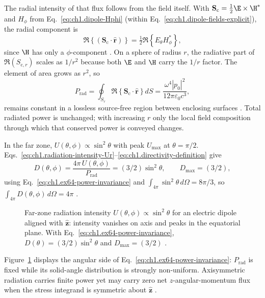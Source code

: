 The radial intensity of that flux follows from the field itself. With
$\mathbf{S}_\mathrm{c}=\tfrac12\E\times\H^*$ and $H_\phi$ from
Eq.~\eqref{eq:ch1.dipole-Hphi} (within Eq.~\eqref{eq:ch1.dipole-fields-explicit}), the radial component is
\begin{equation}
\label{eq:ch1.dipole-sc-radial}
\Re\!\left\{(\mathbf{S}_\mathrm{c}\cdot\hat{\mathbf{r}})\right\}
=\tfrac12\Re\!\left\{E_\theta H_\phi^*\right\},
\end{equation}
since $\H$ has only a $\phi$-component \cite{stratton1941}.
On a sphere of radius $r$, the radiative part of $\Re(S_{\mathrm{c},r})$ scales as $1/r^2$ because both $\E$ and $\H$ carry the $1/r$ factor. The element of area grows as $r^2$, so
\begin{equation}
\label{eq:ch1.ex64-power-invariance}
P_{\mathrm{rad}}=\oint_{S_r}\Re\!\left\{\mathbf{S}_\mathrm{c}\cdot\hat{\mathbf{r}}\right\}dS
=\frac{\omega^4|p_0|^2}{12\pi\varepsilon_0 c^3},
\end{equation}
remains constant in a lossless source-free region between enclosing surfaces \cite{stratton1941}. Total radiated power is unchanged; with increasing $r$ only the local field composition through which that conserved power is conveyed changes.

In the far zone, $U(\theta,\phi)\propto\sin^2\theta$ with peak $U_{\max}$ at $\theta=\pi/2$. Eqs.~\eqref{eq:ch1.radiation-intensity-Ur}--\eqref{eq:ch1.directivity-definition} give
\[
D(\theta,\phi)=\frac{4\pi\,U(\theta,\phi)}{P_{\mathrm{rad}}}
=(3/2)\sin^2\theta,\qquad D_{\max}=(3/2),
\]
using Eq.~\eqref{eq:ch1.ex64-power-invariance} and $\int_{4\pi}\sin^2\theta\,d\Omega=8\pi/3$, so $\int_{4\pi}D(\theta,\phi)\,d\Omega=4\pi$ \cite{stratton1941,harrington2001}.

\begin{figure}[t]
\centering
\VolIPhysFig{\VolIPhysDipoleRadiationPattern}
\caption{Far-zone radiation intensity $U(\theta,\phi)\propto\sin^2\theta$ for an electric dipole aligned with $\hat{\mathbf{z}}$: intensity vanishes on axis and peaks in the equatorial plane. With Eq.~\eqref{eq:ch1.ex64-power-invariance}, $D(\theta)=(3/2)\sin^2\theta$ and $D_{\max}=(3/2)$ \cite{stratton1941,harrington2001}.}
\label{fig:ch1.dipole-radiation-pattern}
\end{figure}

Figure~\ref{fig:ch1.dipole-radiation-pattern} displays the angular side of Eq.~\eqref{eq:ch1.ex64-power-invariance}: $P_{\mathrm{rad}}$ is fixed while its solid-angle distribution is strongly non-uniform. Axisymmetric radiation carries finite power yet may carry zero net $z$-angular-momentum flux when the stress integrand is symmetric about $\hat{\mathbf{z}}$ \cite{beth1936}.

